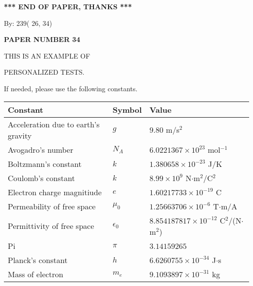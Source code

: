 \documentclass[12pt]{article}
\begin{document}
   
   
   
   
\vspace{1.0in} 
{\textbf{\large{ *** END OF PAPER, THANKS *** }}} 
   
   
\hspace{1.0in} By: 
         239(         26,          34)
   
   
   
   
\newpage 
\setcounter{page}{ 
    34001 } 
   
   
   
   
 {\textbf{ \Large{ PAPER NUMBER          34 }}}
   
   
\vspace{0.2in}
   
   
   
   
   
   
 \vspace{0.2in}
 
 
{\Huge  THIS IS AN EXAMPLE OF}
 
{\Huge  PERSONALIZED TESTS. }
 
If needed, please use the following constants.
 
 
 
\noindent\begin{tabular}{|l|l|l|}
\hline
Constant & Symbol & Value \\
\hline
Acceleration due to earth's gravity &
$g$ &
 $ 9.80 $
m/s$^2$ \\
\hline
Avogadro's number &
$N_A$ &
 $ 6.0221367 \times 10^{23} $
mol$^{-1}$ \\
\hline
Boltzmann's constant &
$k$ &
 $ 1.380658 \times 10^{-23} $
J/K \\
\hline
Coulomb's constant &
$k$ &
 $ 8.99 \times 10^{9} $
N$\cdot $m$^2$/C$^2$ \\
\hline
Electron charge magnitiude &
$e$ &
 $ 1.60217733 \times 10^{-19} $
C \\
\hline
Permeability of free space &
$\mu _0$ &
 $ 1.25663706 \times 10^{-6} $
T$\cdot $m/A \\
\hline
Permittivity of free space &
$\epsilon _0$ &
 $ 8.854187817 \times 10^{-12} $
C$^2$/(N$\cdot $m$^2$) \\
\hline
Pi &
$\pi$ &
 $ 3.14159265 $
$ $ \\
\hline
Planck's constant &
$h$ &
 $ 6.6260755 \times 10^{-34} $
J$\cdot $s \\
\hline
Mass of electron &
$m_e$ &
 $ 9.1093897 \times 10^{-31} $
kg \\
\hline
\end{tabular}
 
\end{document}
